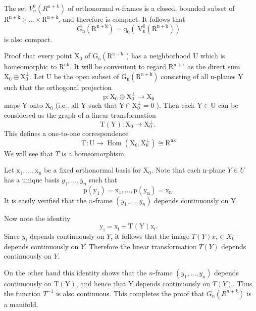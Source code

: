 \documentclass[10pt]{article}
\begin{document}
The set $V_{n}^{0}\left(R^{n+k}\right)$ of orthonormal $n$-frames is a closed, bounded subset of $\mathrm{R}^{\mathrm{n}+\mathrm{k}} \times \ldots \times \mathrm{R}^{\mathrm{n}+\mathrm{k}}$, and therefore is compact. It follows that
$$
\mathrm{G}_{\mathrm{n}}\left(\mathrm{R}^{\mathrm{n}+\mathrm{k}}\right)=\mathrm{q}_{0}\left(\mathrm{~V}_{\mathrm{n}}^{0}\left(\mathrm{R}^{\mathrm{n}+\mathrm{k}}\right)\right)
$$
is also compact.

Proof that every point $\mathrm{X}_{0}$ of $\mathrm{G}_{\mathrm{n}}\left(\mathrm{R}^{\mathrm{n}+\mathrm{k}}\right.$ ) has a neighborhood $\mathrm{U}$ which is homeomorphic to $\mathrm{R}^{\mathrm{nk}}$. It will be convenient to regard $\mathrm{R}^{\mathrm{n}+\mathrm{k}}$ as the direct sum $\mathrm{X}_{0} \oplus \mathrm{X}_{0}^{\perp}$. Let $\mathrm{U}$ be the open subset of $\mathrm{G}_{\mathrm{n}}\left(\mathrm{R}^{\mathrm{n}+\mathrm{k}}\right)$ consisting of all $\mathrm{n}$-planes $\mathrm{Y}$ such that the orthogonal projection
$$
\mathrm{p}: \mathrm{X}_{0} \oplus \mathrm{X}_{0}^{\perp} \rightarrow \mathrm{X}_{0}
$$
maps $\mathrm{Y}$ onto $\mathrm{X}_{0}$ (i.e., all $\mathrm{Y}$ such that $\mathrm{Y} \cap \mathrm{X}_{0}^{\perp}=0$ ). Then each $\mathrm{Y} \in \mathrm{U}$ can be considered as the graph of a linear transformation
$$
\mathrm{T}(\mathrm{Y}): \mathrm{X}_{0} \rightarrow \mathrm{X}_{0}^{\perp} \text {. }
$$
This defines a one-to-one correspondence
$$
\mathrm{T}: \mathrm{U} \rightarrow \operatorname{Hom}\left(\mathrm{X}_{0}, \mathrm{X}_{0}^{\perp}\right) \cong \mathrm{R}^{\mathrm{nk}}
$$
We will see that $T$ is a homeomorphism.

Let $\mathrm{x}_{1}, \ldots, \mathrm{x}_{\mathrm{n}}$ be a fixed orthonormal basis for $\mathrm{X}_{0}$. Note that each n-plane $Y \in U$ has a unique basis $y_{1}, \ldots, y_{n}$ such that
$$
\mathrm{p}\left(\mathrm{y}_{1}\right)=\mathrm{x}_{1}, \ldots, \mathrm{p}\left(\mathrm{y}_{\mathrm{n}}\right)=\mathrm{x}_{\mathrm{n}} .
$$
It is easily verified that the $n$-frame $\left(y_{1}, \ldots, y_{n}\right)$ depends continuously on $\mathrm{Y}$.

Now note the identity
$$
\mathrm{y}_{\mathrm{i}}=\mathrm{x}_{\mathrm{i}}+\mathrm{T}(\mathrm{Y}) \mathrm{x}_{\mathrm{i}} .
$$
Since $y_{i}$ depends continuously on $Y$, it follows that the image $T(Y) x_{i} \in X_{0}^{\perp}$ depends continuously on $Y$. Therefore the linear transformation $T(Y)$ depends continuously on $Y$.

On the other hand this identity shows that the $n$-frame $\left(y_{1}, \ldots, y_{n}\right)$ depends continuously on $\mathrm{T}(\mathrm{Y})$, and hence that $\mathrm{Y}$ depends continuously on $T(Y)$. Thus the function $T^{-1}$ is also continuous. This completes the proof that $G_{n}\left(R^{n+k}\right)$ is a manifold.
\end{document}
